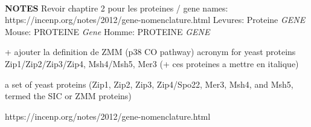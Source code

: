 
%



%
%



\textbf{\\NOTES}
Revoir chaptire 2 pour les proteines / gene names: https://incenp.org/notes/2012/gene-nomenclature.html
Levures: Proteine \textit{GENE}
Mouse: PROTEINE \textit{Gene}
Homme: PROTEINE \textit{GENE}

+ ajouter la definition de ZMM (p38 CO pathway)
acronym for yeast proteins
Zip1/Zip2/Zip3/Zip4, Msh4/Msh5, Mer3
(+ ces proteines a mettre en italique)

a set of yeast proteins (Zip1, Zip2, Zip3, Zip4/Spo22, Mer3, Msh4, and Msh5, termed the SIC or ZMM proteins) 


https://incenp.org/notes/2012/gene-nomenclature.html




